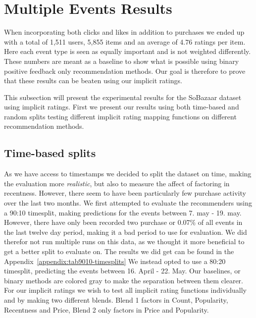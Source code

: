 \section{Multiple Events Results}

When incorporating both clicks and likes in addition to purchases we ended up with a total of 1,511 users, 5,855 items
and an average of 4.76 ratings per item. Here each event type is seen as equally important and is not weighted differently.
These numbers are meant as a baseline to show what is possible using binary positive feedback only recommendation methods.
Our goal is therefore to prove that these results can be beaten using our implicit ratings.

This subsection will present the experimental results for the SoBazaar dataset using implicit ratings. First we present
our results using both time-based and random splits testing different implicit rating mapping functions on different recommendation methods.

\subsection{Time-based splits}

As we have access to timestamps we decided to split the dataset on time, making the evaluation more \textit{realistic}, but also to measure the
affect of factoring in recentness. However, there seem to have been particularly few purchase activity over the last two months. We first attempted to evaluate the recommenders
using a 90:10 timesplit, making predictions for the events between 7. may - 19. may. However, there have only been recorded two purchase or 0.07\% of
all events in the last twelve day period, making it a bad period to use for evaluation. We did therefor not run multiple runs on this
data, as we thought it more beneficial to get a better split to evaluate on. The results we did get can be found in the Appendix~\ref{appendix:tab9010-timesplits}
We instead opted to use a 80:20 timesplit, predicting the events between 16. April - 22. May. Our baselines, or binary methods are colored gray to
make the separation between them clearer. For our implicit ratings we wish to test all implicit rating functions individually and by making two different blends.
Blend 1 factors in Count, Popularity, Recentness and Price, Blend 2 only factors in Price and Popularity.

